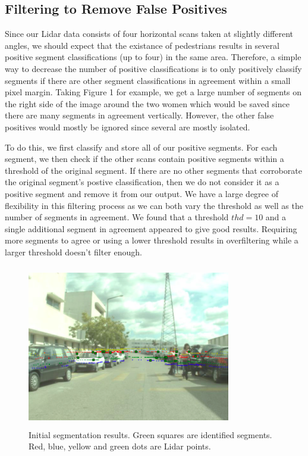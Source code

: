 \documentclass[10pt,twocolumn,letterpaper]{article}
\begin{document}
  \subsection{Filtering to Remove False Positives}
  Since our Lidar data consists of four horizontal scans taken at slightly different angles,
  we should expect that the existance of pedestrians results in several positive segment
  classifications (up to four) in the same area. Therefore, a simple way to decrease
  the number of positive classifications is to only positively classify segments if there
  are other segment classifications in agreement within a small pixel margin.
  Taking Figure 1 for example, we get a large number of segments on the right side
  of the image around the two women which would be saved since there are many segments in
  agreement vertically. However, the other false positives would mostly be ignored
  since several are mostly isolated.

  To do this, we first classify and store all of our positive segments. For each
  segment, we then check if the other scans contain positive segments within a threshold
  of the original segment. If there are no other segments that corroborate
  the original segment's postive classification, then we do not consider it as a positive
  segment and remove it from our output. We have a large degree of flexibility in
  this filtering process as we can both vary the threshold as well as the number of segments
  in agreement. We found that a threshold $ thd = 10 $ and a single additional segment in
  agreement appeared to give good results. Requiring more segments to agree or using a lower
  threshold results in overfiltering while a larger threshold doesn't filter enough.

  \begin{figure}
    \includegraphics[height=2.8in, width=3.5in]{images/initial_result.png}
    \caption{ Initial segmentation results. Green squares are identified
    segments. Red, blue, yellow and green dots are Lidar points.}
  \end{figure}
\end{document}
